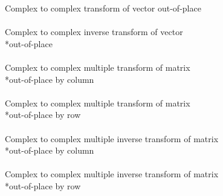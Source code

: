 {\hspace*{2.9cm}Complex to complex transform of vector  out-of-place\\
\hspace*{3.5cm}\\
 \hspace*{2.9cm}Complex to complex inverse transform of vector \\*\hspace*{2.9cm}out-of-place\\
\hspace*{3.5cm}\\
 \hspace*{2.9cm}Complex to complex multiple transform of matrix \\*\hspace*{2.9cm}out-of-place by column\\
\hspace*{3.5cm}\\
 \hspace*{2.9cm}Complex to complex multiple transform of matrix \\*\hspace*{2.9cm}out-of-place by row\\
\hspace*{3.5cm}\\
 \hspace*{2.9cm}Complex to complex multiple inverse transform of matrix \\*\hspace*{2.9cm}out-of-place by column\\
\hspace*{3.5cm}\\
 \hspace*{2.9cm}Complex to complex multiple inverse transform of matrix \\*\hspace*{2.9cm}out-of-place by row\\
\hspace*{3.5cm}\\
}
